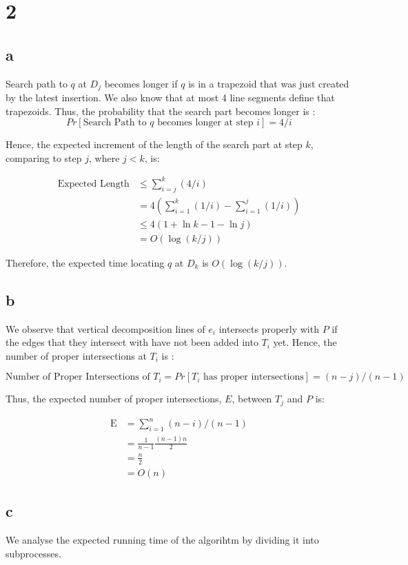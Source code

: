 
\section*{2}
\subsection*{a}
Search path to $q$ at $D_j$ becomes longer if $q$ is in a trapezoid that was just
created by the latest insertion. We also know that at most 4 line segments define
that trapezoids. Thus, the probability that the search part becomes longer is :
$$
Pr[\text{Search Path to $q$ becomes longer at step $i$}] = 4/i
$$

Hence, the expected increment of the length of the search part at step $k$, comparing to step $j$,
where $j<k$, is:

\begin{align*}
    \text{Expected Length} &\leq \sum_{i=j}^{k}( 4/i ) \\
    &= 4( \sum_{i=1}^{k}( 1/i ) -  \sum_{i=1}^{j}( 1/i ) ) \\
    &\leq 4( 1 + \ln k - 1 - \ln j ) \\
    &= O(\log(k/j))
\end{align*}

Therefore, the expected time locating $q$ at $D_k$ is $O(\log(k/j))$.

\subsection*{b}
We observe that vertical decomposition lines of $e_i$ intersects properly with $P$ if 
the edges that they intersect with have not been added into $T_i$ yet. Hence,
the number of proper intersections at $T_i$ is :

$$
\text{Number of Proper Intersections of $T_i$} = Pr[\text{$T_i$ has proper intersections}] = (n-j)/(n-1)
$$

Thus, the expected number of proper intersections, $E$, between $T_j$ and $P$ is:

\begin{align*}
    \text{E} &= \sum_{i=1}^{n}(n-i)/(n-1) \\
    &= \frac{1}{n-1}\frac{(n-1)n}{2} \\
    &= \frac{n}{2} \\
    &= O(n)
\end{align*}

\subsection*{c}
We analyse the expected running time of the algorihtm by dividing it into subprocesses.

